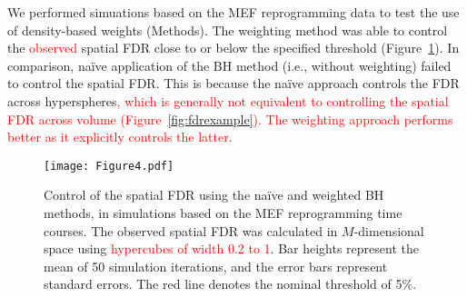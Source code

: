 \documentclass{article}
\newcommand\revised[1]{\textcolor{red}{#1}}
\begin{document}
We performed simuations based on the MEF reprogramming data to test the use of density-based weights (Methods).
The weighting method was able to control the \revised{observed} spatial FDR close to or below the specified threshold (Figure~\ref{fig:fdr}).
In comparison, na\"ive application of the BH method (i.e., without weighting) failed to control the spatial FDR.
This is because the na\"ive approach controls the FDR across hyperspheres\revised{, which is generally not equivalent to controlling the spatial FDR across volume (Figure~\ref{fig:fdrexample}).
The weighting approach performs better as it explicitly controls the latter.}


\begin{figure}[bt]
\begin{center}
\texttt{[image: Figure4.pdf]}
\end{center}
\caption{
    Control of the spatial FDR using the na\"ive and weighted BH methods, in simulations based on the MEF reprogramming time courses.
    The observed spatial FDR was calculated in $M$-dimensional space using \revised{hypercubes of width 0.2 to 1}.
    Bar heights represent the mean of 50 simulation iterations, and the error bars represent standard errors.
    The red line denotes the nominal threshold of 5\%.
}
\label{fig:fdr}
\end{figure}

\end{document}
